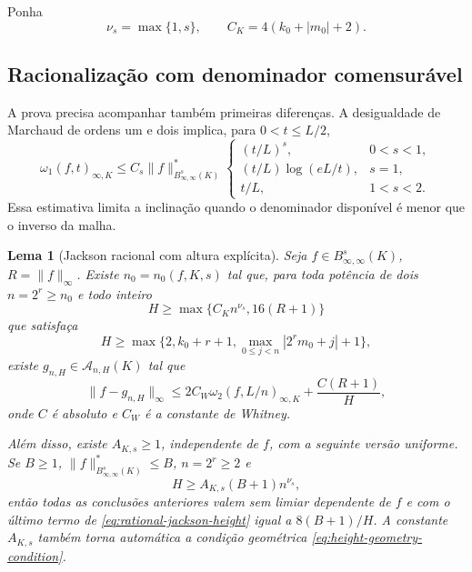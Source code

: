 \documentclass[11pt,a4paper]{article}
\newtheorem{lemma}[theorem]{Lema}
\theoremstyle{definition}
\theoremstyle{remark}
\newcommand{\Aclass}{\mathcal{A}}
\begin{document}
Ponha
\begin{equation}
 \nu_s=\max\{1,s\},
 \qquad C_K=4(k_0+|m_0|+2).
 \label{eq:height-schedule-constants}
\end{equation}

\subsection{Racionalização com denominador comensurável}

A prova precisa acompanhar também primeiras diferenças. A desigualdade de
Marchaud de ordens um e dois
\citep{devorelorentz1993,lorentz1996} implica, para $0<t\le L/2$,
\begin{equation}
 \omega_1(f,t)_{\infty,K}
 \le C_s\|f\|_{B^s_{\infty,\infty}(K)}^*
 \begin{cases}
  (t/L)^s,&0<s<1,\\
  (t/L)\log(eL/t),&s=1,\\
  t/L,&1<s<2.
 \end{cases}
 \label{eq:marchaud-regimes}
\end{equation}
Essa estimativa limita a inclinação quando
o denominador disponível é menor que o inverso da malha.

\begin{lemma}[Jackson racional com altura explícita]
\label{lem:rational-jackson-height}
Seja $f\in B^s_{\infty,\infty}(K)$, $R=\|f\|_\infty$. Existe
$n_0=n_0(f,K,s)$ tal que, para toda potência de dois $n=2^r\ge n_0$ e todo
inteiro
\[
 H\ge\max\{C_Kn^{\nu_s},16(R+1)\}
\]
que satisfaça
\begin{equation}
 H\ge\max\{2,k_0+r+1,
      \max_{0\le j<n}|2^rm_0+j|+1\},
 \label{eq:height-geometry-condition}
\end{equation}
existe $g_{n,H}\in\Aclass_{n,H}(K)$ tal que
\begin{equation}
 \|f-g_{n,H}\|_\infty
 \le 2C_W\omega_2(f,L/n)_{\infty,K}
      +\frac{C(R+1)}{H},
 \label{eq:rational-jackson-height}
\end{equation}
onde $C$ é absoluto e $C_W$ é a constante de Whitney.

Além disso, existe $A_{K,s}\ge1$, independente de $f$, com a seguinte versão
uniforme. Se $B\ge1$, $\|f\|_{B^s_{\infty,\infty}(K)}^*\le B$, $n=2^r\ge2$
e
\begin{equation}
 H\ge A_{K,s}(B+1)n^{\nu_s},
 \label{eq:uniform-ball-height-threshold}
\end{equation}
então todas as conclusões anteriores valem sem limiar dependente de $f$ e com
o último termo de \eqref{eq:rational-jackson-height} igual a
$8(B+1)/H$. A constante $A_{K,s}$ também torna automática a condição
geométrica \eqref{eq:height-geometry-condition}.
\end{lemma}
\end{document}
